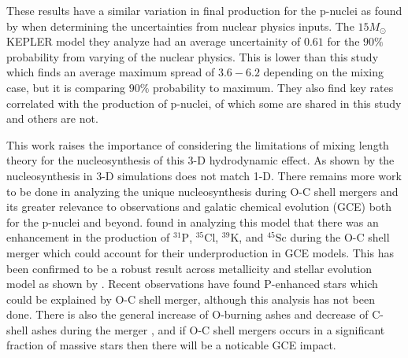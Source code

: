 These results have a similar variation in final production for the p-nuclei as found by \cite{rauscherUncertaintiesProductionNuclei2016} when determining the uncertainties from nuclear physics inputs.
The $15M_\odot$ KEPLER model they analyze had an average uncertainity of $0.61$ for the $90\%$ probability from varying of the nuclear physics.
This is lower than this study which finds an average maximum spread of $3.6-6.2$ depending on the mixing case, but it is comparing $90\%$ probability to maximum.
They also find key rates correlated with the production of p-nuclei, of which some are shared in this study and others are not.

This work raises the importance of considering the limitations of mixing length theory for the nucleosynthesis of this 3-D hydrodynamic effect.
As shown by \cite{rizzutiShellMergersLate2024a} the nucleosynthesis in 3-D simulations does not match 1-D.
There remains more work to be done in analyzing the unique nucleosynthesis during O-C shell mergers and its greater relevance to observations and galatic chemical evolution (GCE) both for the p-nuclei and beyond. 
\cite{ritterConvectivereactiveNucleosynthesisSc2018} found in analyzing this model that there was an enhancement in the production of $^{31}\mathrm{P}$, $^{35}\mathrm{Cl}$, $^{39}\mathrm{K}$, and $^{45}\mathrm{Sc}$ during the O-C shell merger which could account for their underproduction in GCE models.
This has been confirmed to be a robust result across metallicity and stellar evolution model as shown by \cite{robertiOccurrenceImpactCarbonOxygen2025}.
Recent observations have found $\mathrm{P}$-enhanced stars \citep{masseronPhosphorusrichStarsUnusual2020, braunerUnveilingChemicalFingerprint2023, braunerUnveilingChemicalFingerprint2024} which could be explained by O-C shell merger, although this analysis has not been done.
There is also the general increase of O-burning ashes and decrease of C-shell ashes during the merger \citep{robertiOccurrenceImpactCarbonOxygen2025}, and if O-C shell mergers occurs in a  significant fraction of massive stars then there will be a noticable GCE impact.

